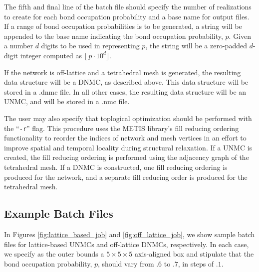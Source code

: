 \documentclass{article}
\begin{document}
The fifth and final line of the batch file should specify the number of
realizations to create for each bond occupation probability and a base name
for output files. If a range of bond occupation probabilities is to be
generated, a string will be appended to the base name indicating the bond
occupation probability, $p$. Given a number $d$ digits to be used in
representing $p$, the string will be a zero-padded $d$-digit integer computed
as $\lfloor \hspace{2pt}p \cdot 10^d \rfloor$.  

If the network is off-lattice and a tetrahedral mesh is generated, the
resulting data structure will be a DNMC, as described above. This data
structure will be stored in a .dnmc file. In all other cases, the resulting
data structure will be an UNMC, and will be stored in a .nmc file.

The user may also specify that toplogical optimization should be performed with
the ``\texttt{-r}'' flag. This procedure uses the METIS library's fill reducing
ordering functionality to reorder the indices of network and mesh vertices in an
effort to improve spatial and temporal locality during structural relaxation. If
a UNMC is created, the fill reducing ordering is performed using the adjacency
graph of the tetrahedral mesh. If a DNMC is constructed, one fill reducing
ordering is produced for the network, and a separate fill reducing order is
produced for the tetrahedral mesh.

\subsection{Example Batch Files}

In Figures \ref{fig:lattice_based_job} and \ref{fig:off_lattice_job}, we
show sample batch files for lattice-based UNMCs and off-lattice DNMCs,
respectively. In each case, we specify as the outer bounds a 
$5 \times 5 \times 5$ axis-aligned box and stipulate that the bond occupation
probability, $p$, should vary from $.6$ to $.7$, in steps of $.1$.
\end{document}
